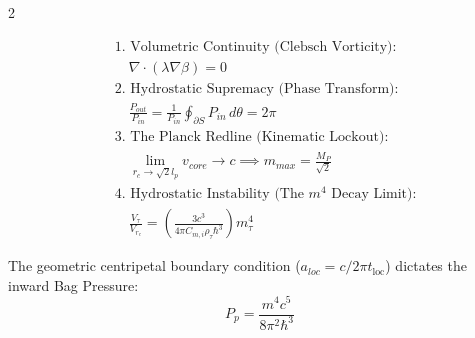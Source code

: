 \begin{multicols}{2}
\begin{tcolorbox}[cheatbox, title={\refstepcounter{cheatnum}\label{box:unified_engine}\thecheatnum. The Unified Topological Engine \scriptsize\hfill\hyperref[sec:deriv_unified_engine]{[Proof $\downarrow$]}}]
\begin{align}
    &\text{1. Volumetric Continuity (Clebsch Vorticity):} \nonumber \\
    &\quad \nabla \cdot (\lambda \nabla \beta) = 0 \label{eq:engine_transduction} \\
    &\text{2. Hydrostatic Supremacy (Phase Transform):} \nonumber \\
    &\quad \frac{P_{out}}{P_{in}} = \frac{1}{P_{in}} \oint_{\partial S} P_{in} \, d\theta = 2\pi \label{eq:engine_supremacy} \\
    &\text{3. The Planck Redline (Kinematic Lockout):} \nonumber \\
    &\quad \lim_{r_c \to \sqrt{2} l_p} v_{core} \to c \implies m_{max} = \frac{M_P}{\sqrt{2}} \label{eq:engine_redline} \\ %
    &\text{4. Hydrostatic Instability (The $m^4$ Decay Limit):} \nonumber \\
    &\quad \frac{V_\tau}{V_{r_c}} = \left(\frac{3c^3}{4\pi C_{m,i} \rho_{\tau}\hbar^3}\right) m_\tau^4 \label{eq:engine_decay} 
\end{align}
\end{tcolorbox}

\begin{tcolorbox}[cheatbox, title={\refstepcounter{cheatnum}\label{box:bag_pressure}\thecheatnum. Confinement Pressure \& Work \scriptsize\hfill\hyperref[sec:deriv_bag_pressure]{[Proof $\downarrow$]}}]
The geometric centripetal boundary condition ($a_{loc} = c/2\pi t_{\text{loc}}$) dictates the inward Bag Pressure:
\begin{equation}\label{eq:pp}
    P_p = \frac{m^4 c^5}{8\pi^2 \hbar^3} 
\end{equation}

\end{tcolorbox}



\end{multicols}
